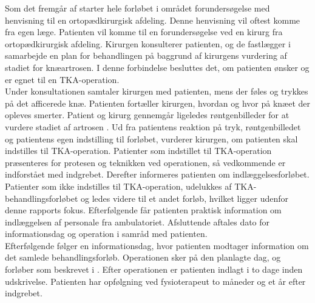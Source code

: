 Som det fremgår af  starter hele forløbet i området forundersøgelse med henvisning til en ortopædkirurgisk afdeling. Denne henvisning vil oftest komme fra egen læge. Patienten vil komme til en forundersøgelse ved en kirurg fra ortopædkirurgisk afdeling. Kirurgen konsulterer patienten, og de fastlægger i samarbejde en plan for behandlingen på baggrund af kirurgens vurdering af stadiet for knæartrosen. I denne forbindelse besluttes det, om patienten ønsker og er egnet til en TKA-operation. \\
Under konsultationen samtaler kirurgen med patienten, mens der føles og trykkes på det afficerede knæ. Patienten fortæller kirurgen, hvordan og hvor på knæet der opleves smerter. Patient og kirurg gennemgår ligeledes røntgenbilleder for at vurdere stadiet af artrosen \citep{pritka2015}.
Ud fra patientens reaktion på tryk, røntgenbilledet og patientens egen indstilling til forløbet, vurderer kirurgen, om patienten skal indstilles til TKA-operation. Patienter som indstillet til TKA-operation præsenteres for protesen og teknikken ved operationen, så vedkommende er indforstået med indgrebet. Derefter informeres patienten om indlæggelsesforløbet. Patienter som ikke indstilles til TKA-operation, udelukkes af TKA-behandlingsforløbet og ledes videre til et andet forløb, hvilket ligger udenfor denne rapports fokus.
Efterfølgende får patienten praktisk information om indlæggelsen af personale fra ambulatoriet. Afsluttende aftales dato for informationsdag og operation i samråd med patienten. \citep{pritka2015} \\
Efterfølgende følger en informationsdag, hvor patienten modtager information om det samlede behandlingsforløb. Operationen sker på den planlagte dag, og forløber som beskrevet i . Efter operationen er patienten indlagt i to dage inden udskrivelse. Patienten har opfølgning ved fysioterapeut to måneder og et år efter indgrebet. \citep{pritka2015} 


